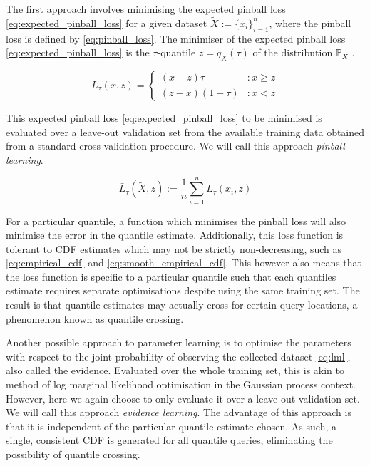 \documentclass[twoside]{article} \usepackage{aistats2017}
\theoremstyle{definition}
\newcommand{\rv}[1]{{#1}}
\newcommand{\ds}[1]{\tilde{#1}}
\begin{document}
	The first approach involves minimising the expected pinball loss \eqref{eq:expected_pinball_loss} for a given dataset $\ds{X} := \{x_{i}\}_{i = 1}^{n}$, where the pinball loss is defined by \eqref{eq:pinball_loss}. The minimiser of the expected pinball loss \eqref{eq:expected_pinball_loss} is the $\tau$-quantile $z = q_{\rv{X}}(\tau)$ of the distribution $\mathbb{P}_{\rv{X}}$ \citep{Koenker1978}.
	
	\begin{equation}
		L_{\tau}(x, z) = \left\{ \begin{array}{lr}
			(x - z) \tau & : x \geq z \\
			(z - x) (1 - \tau) & : x < z
		\end{array} \right.
	\label{eq:pinball_loss}
	\end{equation}
	
	This expected pinball loss \eqref{eq:expected_pinball_loss} to be minimised is evaluated over a leave-out validation set from the available training data obtained from a standard cross-validation procedure. We will call this approach \textit{pinball learning}.
	
	\begin{equation}
		\bar{L}_{\tau}(\ds{X}, z) := \frac{1}{n} \sum_{i = 1}^{n} L_{\tau}(x_{i}, z)
	\label{eq:expected_pinball_loss}
	\end{equation}
	
	For a particular quantile, a function which minimises the pinball loss will also minimise the
	error in the quantile estimate. Additionally, this loss function is tolerant to CDF estimates which may not be strictly non-decreasing, such as \eqref{eq:empirical_cdf} and \eqref{eq:smooth_empirical_cdf}. This however also means that the loss function is specific to a particular quantile such that each quantiles estimate requires separate optimisations despite using the same training set. The result is that quantile estimates may actually cross for certain query locations, a phenomenon known as quantile crossing.
	
	Another possible approach to parameter learning is to optimise the parameters with respect to the joint probability of observing the collected dataset \eqref{eq:lml}, also called the evidence. Evaluated over the whole training set, this is akin to method of log marginal likelihood optimisation in the Gaussian process context. However, here we again choose to only evaluate it over a leave-out validation set. We will call this approach \textit{evidence learning}. The advantage of this approach is that it is independent of the particular quantile estimate chosen. As such, a single, consistent CDF is generated for all quantile queries, eliminating the possibility of quantile crossing. 
	
\end{document}
